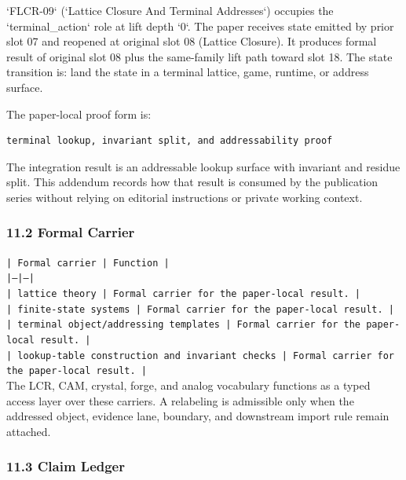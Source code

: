 \documentclass[11pt]{article}
\begin{document}
`FLCR-09` (`Lattice Closure And Terminal Addresses`) occupies the `terminal\_action` role at lift depth `0`.
The paper receives state emitted by prior slot 07 and reopened at original slot 08 (Lattice Closure). It produces formal result of original slot 08 plus the same-family lift path toward slot 18. The state transition is:
land the state in a terminal lattice, game, runtime, or address surface.

The paper-local proof form is:

\begin{verbatim}
terminal lookup, invariant split, and addressability proof
\end{verbatim}

The integration result is an addressable lookup surface with invariant and residue split. This addendum records how that result is
consumed by the publication series without relying on editorial instructions or
private working context.

\subsubsection*{11.2 Formal Carrier}

\noindent\texttt{| Formal carrier | Function |}\\
\noindent\texttt{|---|---|}\\
\noindent\texttt{| lattice theory | Formal carrier for the paper-local result. |}\\
\noindent\texttt{| finite-state systems | Formal carrier for the paper-local result. |}\\
\noindent\texttt{| terminal object/addressing templates | Formal carrier for the paper-local result. |}\\
\noindent\texttt{| lookup-table construction and invariant checks | Formal carrier for the paper-local result. |}\\

The LCR, CAM, crystal, forge, and analog vocabulary functions as a typed access
layer over these carriers. A relabeling is admissible only when the addressed
object, evidence lane, boundary, and downstream import rule remain attached.

\subsubsection*{11.3 Claim Ledger}
\end{document}
